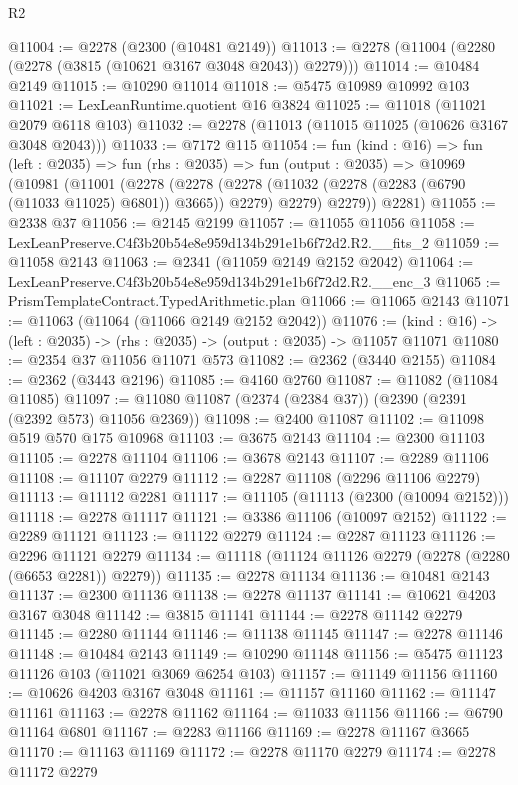 \begin{lexlean}{R2}
\begin{coremodule}
@11004 := @2278 (@2300 (@10481 @2149))
@11013 := @2278 (@11004 (@2280 (@2278 (@3815 (@10621 @3167 @3048 @2043)) @2279)))
@11014 := @10484 @2149
@11015 := @10290 @11014
@11018 := @5475 @10989 @10992 @103
@11021 := LexLeanRuntime.quotient @16 @3824
@11025 := @11018 (@11021 @2079 @6118 @103)
@11032 := @2278 (@11013 (@11015 @11025 (@10626 @3167 @3048 @2043)))
@11033 := @7172 @115
@11054 := fun (kind : @16) =>
  fun (left : @2035) =>
  fun (rhs : @2035) =>
  fun (output : @2035) =>
  @10969
    (@10981
      (@11001
        (@2278
          (@2278 (@2278 (@11032 (@2278 (@2283 (@6790 (@11033 @11025) @6801)) @3665)) @2279) @2279)
          @2279))
      @2281)
@11055 := @2338 @37
@11056 := @2145 @2199
@11057 := @11055 @11056
@11058 := LexLeanPreserve.C4f3b20b54e8e959d134b291e1b6f72d2.R2.__fits_2
@11059 := @11058 @2143
@11063 := @2341 (@11059 @2149 @2152 @2042)
@11064 := LexLeanPreserve.C4f3b20b54e8e959d134b291e1b6f72d2.R2.__enc_3
@11065 := PrismTemplateContract.TypedArithmetic.plan
@11066 := @11065 @2143
@11071 := @11063 (@11064 (@11066 @2149 @2152 @2042))
@11076 := (kind : @16) -> (left : @2035) -> (rhs : @2035) -> (output : @2035) -> @11057 @11071
@11080 := @2354 @37 @11056 @11071 @573
@11082 := @2362 (@3440 @2155)
@11084 := @2362 (@3443 @2196)
@11085 := @4160 @2760
@11087 := @11082 (@11084 @11085)
@11097 := @11080 @11087 (@2374 (@2384 @37)) (@2390 (@2391 (@2392 @573) @11056 @2369))
@11098 := @2400 @11087
@11102 := @11098 @519 @570 @175 @10968
@11103 := @3675 @2143
@11104 := @2300 @11103
@11105 := @2278 @11104
@11106 := @3678 @2143
@11107 := @2289 @11106
@11108 := @11107 @2279
@11112 := @2287 @11108 (@2296 @11106 @2279)
@11113 := @11112 @2281
@11117 := @11105 (@11113 (@2300 (@10094 @2152)))
@11118 := @2278 @11117
@11121 := @3386 @11106 (@10097 @2152)
@11122 := @2289 @11121
@11123 := @11122 @2279
@11124 := @2287 @11123
@11126 := @2296 @11121 @2279
@11134 := @11118 (@11124 @11126 @2279 (@2278 (@2280 (@6653 @2281)) @2279))
@11135 := @2278 @11134
@11136 := @10481 @2143
@11137 := @2300 @11136
@11138 := @2278 @11137
@11141 := @10621 @4203 @3167 @3048
@11142 := @3815 @11141
@11144 := @2278 @11142 @2279
@11145 := @2280 @11144
@11146 := @11138 @11145
@11147 := @2278 @11146
@11148 := @10484 @2143
@11149 := @10290 @11148
@11156 := @5475 @11123 @11126 @103 (@11021 @3069 @6254 @103)
@11157 := @11149 @11156
@11160 := @10626 @4203 @3167 @3048
@11161 := @11157 @11160
@11162 := @11147 @11161
@11163 := @2278 @11162
@11164 := @11033 @11156
@11166 := @6790 @11164 @6801
@11167 := @2283 @11166
@11169 := @2278 @11167 @3665
@11170 := @11163 @11169
@11172 := @2278 @11170 @2279
@11174 := @2278 @11172 @2279

\end{coremodule}
\end{lexlean}
